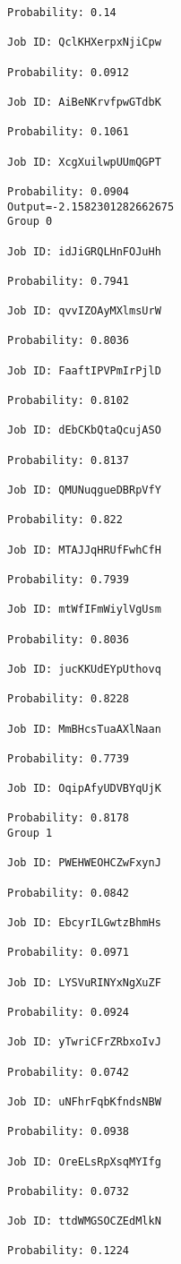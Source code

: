 \documentclass[11pt]{article}
\begin{document}
\begin{Verbatim}[commandchars=\\\{\}]
Probability: 0.14

Job ID: QclKHXerpxNjiCpw

Probability: 0.0912

Job ID: AiBeNKrvfpwGTdbK

Probability: 0.1061

Job ID: XcgXuilwpUUmQGPT

Probability: 0.0904
Output=-2.1582301282662675
Group 0

Job ID: idJiGRQLHnFOJuHh

Probability: 0.7941

Job ID: qvvIZOAyMXlmsUrW

Probability: 0.8036

Job ID: FaaftIPVPmIrPjlD

Probability: 0.8102

Job ID: dEbCKbQtaQcujASO

Probability: 0.8137

Job ID: QMUNuqgueDBRpVfY

Probability: 0.822

Job ID: MTAJJqHRUfFwhCfH

Probability: 0.7939

Job ID: mtWfIFmWiylVgUsm

Probability: 0.8036

Job ID: jucKKUdEYpUthovq

Probability: 0.8228

Job ID: MmBHcsTuaAXlNaan

Probability: 0.7739

Job ID: OqipAfyUDVBYqUjK

Probability: 0.8178
Group 1

Job ID: PWEHWEOHCZwFxynJ

Probability: 0.0842

Job ID: EbcyrILGwtzBhmHs

Probability: 0.0971

Job ID: LYSVuRINYxNgXuZF

Probability: 0.0924

Job ID: yTwriCFrZRbxoIvJ

Probability: 0.0742

Job ID: uNFhrFqbKfndsNBW

Probability: 0.0938

Job ID: OreELsRpXsqMYIfg

Probability: 0.0732

Job ID: ttdWMGSOCZEdMlkN

Probability: 0.1224


\end{Verbatim}
\end{document}
